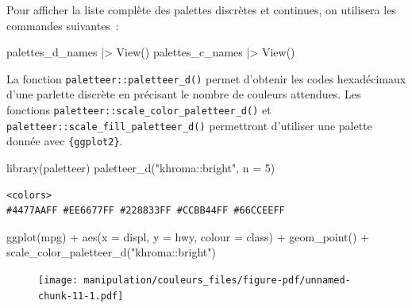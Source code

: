 \documentclass[
  letterpaper,
  DIV=11,
  numbers=noendperiod,
  oneside]{scrreprt}
\newenvironment{Shaded}{\begin{snugshade}}{\end{snugshade}}
\newcommand{\AttributeTok}[1]{\textcolor[rgb]{0.40,0.45,0.13}{#1}}
\newcommand{\DecValTok}[1]{\textcolor[rgb]{0.68,0.00,0.00}{#1}}
\newcommand{\FunctionTok}[1]{\textcolor[rgb]{0.28,0.35,0.67}{#1}}
\newcommand{\NormalTok}[1]{\textcolor[rgb]{0.00,0.23,0.31}{#1}}
\newcommand{\SpecialCharTok}[1]{\textcolor[rgb]{0.37,0.37,0.37}{#1}}
\newcommand{\StringTok}[1]{\textcolor[rgb]{0.13,0.47,0.30}{#1}}
\begin{document}
Pour afficher la liste complète des palettes discrètes et continues, on
utilisera les commandes suivantes~:

\begin{Shaded}
\begin{Highlighting}[]
\NormalTok{palettes\_d\_names }\SpecialCharTok{|\textgreater{}} \FunctionTok{View}\NormalTok{()}
\NormalTok{palettes\_c\_names }\SpecialCharTok{|\textgreater{}} \FunctionTok{View}\NormalTok{()}
\end{Highlighting}
\end{Shaded}

La fonction \texttt{paletteer::paletteer\_d()} permet d'obtenir les
codes hexadécimaux d'une parlette discrète en précisant le nombre de
couleurs attendues. Les fonctions
\texttt{paletteer::scale\_color\_paletteer\_d()} et
\texttt{paletteer::scale\_fill\_paletteer\_d()} permettront d'utiliser
une palette donnée avec \texttt{\{ggplot2\}}.

\begin{Shaded}
\begin{Highlighting}[]
\FunctionTok{library}\NormalTok{(paletteer)}
\FunctionTok{paletteer\_d}\NormalTok{(}\StringTok{"khroma::bright"}\NormalTok{, }\AttributeTok{n =} \DecValTok{5}\NormalTok{)}
\end{Highlighting}
\end{Shaded}

\begin{verbatim}
<colors>
#4477AAFF #EE6677FF #228833FF #CCBB44FF #66CCEEFF 
\end{verbatim}

\begin{Shaded}
\begin{Highlighting}[]
\FunctionTok{ggplot}\NormalTok{(mpg) }\SpecialCharTok{+}
  \FunctionTok{aes}\NormalTok{(}\AttributeTok{x =}\NormalTok{ displ, }\AttributeTok{y =}\NormalTok{ hwy, }\AttributeTok{colour =}\NormalTok{ class) }\SpecialCharTok{+}
  \FunctionTok{geom\_point}\NormalTok{() }\SpecialCharTok{+}
  \FunctionTok{scale\_color\_paletteer\_d}\NormalTok{(}\StringTok{"khroma::bright"}\NormalTok{)}
\end{Highlighting}
\end{Shaded}

\begin{figure}[H]

{\centering \texttt{[image: manipulation/couleurs\_files/figure-pdf/unnamed-chunk-11-1.pdf]}

}

\end{figure}
\end{document}
